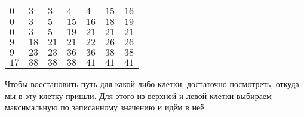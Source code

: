 \begin{center}
\begin{tabular}{| C{.6cm} | C{.6cm} | C{.6cm} | C{.6cm} | C{.6cm} | C{.6cm} | C{.6cm} |}
    \hline
    $0$ & $3$ & $3$ & $4$ & $4$ & $15$ & $16$\\
    \hline
    $0$ & $3$ & $5$ & $15$ & $16$ & $18$ & $19$\\
    \hline
    $0$ & $3$ & $5$ & $19$ & $21$ & $21$ & $21$\\
    \hline
    $9$ & $18$ & $21$ & $21$ & $22$ & $26$ & $26$\\
    \hline
    $9$ & $23$ & $23$ & $36$ & $36$ & $38$ & $38$\\
    \hline
    $17$ & $38$ & $38$ & $38$ & $41$ & $41$ & $41$\\
    \hline
\end{tabular}
\end{center}

Чтобы восстановить путь для какой-либо клетки, достаточно посмотреть, откуда мы в эту клетку пришли. Для этого из верхней и левой клетки выбираем максимальную по записанному значению и идём в неё.

